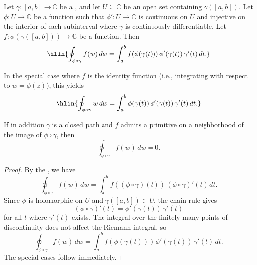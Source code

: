 \begin{proposition} \label{proposition:substitution_rule_for_contour_integrals}
Let $\gamma : [a,b] \to \mathbb{C}$ be a , and let $U \subseteq \mathbb{C}$ be an open set containing $\gamma([a,b])$. Let $\phi : U \to \mathbb{C}$ be a  function such that $\phi' : U \to \mathbb{C}$ is continuous on $U$ and injective on the interior of each subinterval where $\gamma$ is continuously differentiable. Let $f : \phi(\gamma([a,b])) \to \mathbb{C}$ be a  function. Then
$$\hlin{\oint_{\phi \circ \gamma} f(w)\,dw = \int_a^b f(\phi(\gamma(t)))\,\phi'(\gamma(t))\,\gamma'(t)\,dt.}$$

In the special case where $f$ is the identity function (i.e., integrating with respect to $w = \phi(z)$), this yields
$$\hlin{\oint_{\phi \circ \gamma} w\,dw = \int_a^b \phi(\gamma(t))\,\phi'(\gamma(t))\,\gamma'(t)\,dt.}$$

If in addition $\gamma$ is a closed path and $f$ admits a primitive on a neighborhood of the image of $\phi \circ \gamma$, then
$$\oint_{\phi \circ \gamma} f(w)\,dw = 0.$$
\end{proposition}

\begin{proof}
    By the , we have
    $$\oint_{\phi \circ \gamma} f(w)\,dw = \int_a^b f((\phi \circ \gamma)(t))\,(\phi \circ \gamma)'(t)\,dt.$$
    Since $\phi$ is holomorphic on $U$ and $\gamma([a,b]) \subset U$, the chain rule gives
    $$(\phi \circ \gamma)'(t) = \phi'(\gamma(t))\,\gamma'(t)$$
    for all $t$ where $\gamma'(t)$ exists. The integral over the finitely many points of discontinuity does not affect the Riemann integral, so
    $$\oint_{\phi \circ \gamma} f(w)\,dw = \int_a^b f(\phi(\gamma(t)))\,\phi'(\gamma(t))\,\gamma'(t)\,dt.$$
    The special cases follow immediately.
\end{proof}
